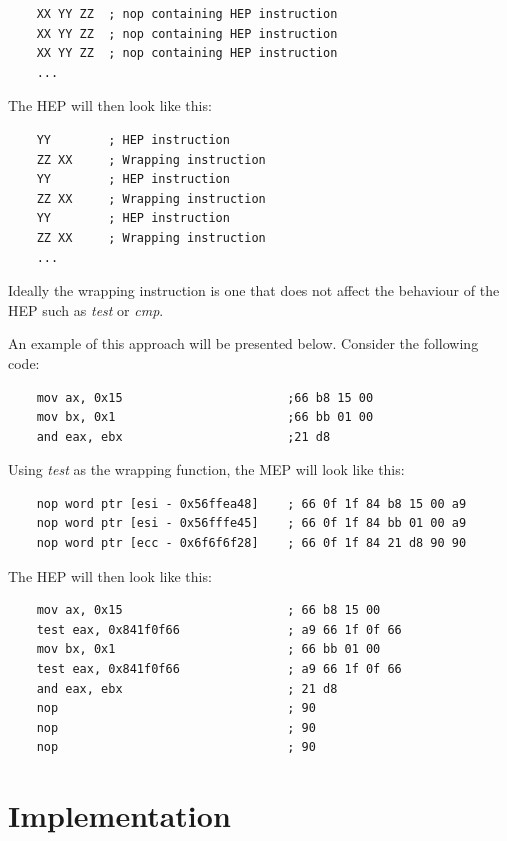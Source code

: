 \documentclass[11pt,twoside]{eitExjobb}
\begin{document}
\begin{verbatim}
    XX YY ZZ  ; nop containing HEP instruction
    XX YY ZZ  ; nop containing HEP instruction
    XX YY ZZ  ; nop containing HEP instruction
    ...
\end{verbatim} 

\noindent The HEP will then look like this:

\begin{verbatim}
    YY        ; HEP instruction
    ZZ XX     ; Wrapping instruction
    YY        ; HEP instruction
    ZZ XX     ; Wrapping instruction
    YY        ; HEP instruction
    ZZ XX     ; Wrapping instruction
    ...
\end{verbatim}

\noindent Ideally the wrapping instruction is one that does not affect the behaviour of the HEP such as \emph{test} or \emph{cmp}. 

An example of this approach will be presented below. Consider the following code:

\begin{verbatim}
    mov ax, 0x15                       ;66 b8 15 00
    mov bx, 0x1                        ;66 bb 01 00
    and eax, ebx                       ;21 d8
\end{verbatim}

\noindent Using \emph{test} as the wrapping function, the MEP will look like this:

\begin{verbatim}
    nop word ptr [esi - 0x56ffea48]    ; 66 0f 1f 84 b8 15 00 a9
    nop word ptr [esi - 0x56fffe45]    ; 66 0f 1f 84 bb 01 00 a9
    nop word ptr [ecc - 0x6f6f6f28]    ; 66 0f 1f 84 21 d8 90 90
\end{verbatim}

\noindent The HEP will then look like this: 

\begin{verbatim}
    mov ax, 0x15                       ; 66 b8 15 00
    test eax, 0x841f0f66               ; a9 66 1f 0f 66
    mov bx, 0x1                        ; 66 bb 01 00
    test eax, 0x841f0f66               ; a9 66 1f 0f 66
    and eax, ebx                       ; 21 d8
    nop                                ; 90
    nop                                ; 90
    nop                                ; 90
\end{verbatim}

\chapter{Implementation}
\end{document}
